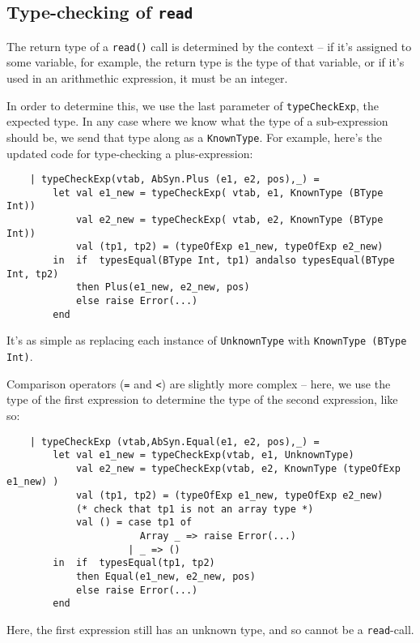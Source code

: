 \documentclass{article}
\begin{document}
\subsection{Type-checking of \texttt{read}}
The return type of a \texttt{read()} call is determined by the context -- if it's assigned to some variable, for example, the return type is the type of that variable, or if it's used in an arithmethic expression, it must be an integer.

In order to determine this, we use the last parameter of \texttt{typeCheckExp}, the expected type. In any case where we know what the type of a sub-expression should be, we send that type along as a \texttt{KnownType}. For example, here's the updated code for type-checking a plus-expression:

\begin{lstlisting}
    | typeCheckExp(vtab, AbSyn.Plus (e1, e2, pos),_) =
        let val e1_new = typeCheckExp( vtab, e1, KnownType (BType Int))
            val e2_new = typeCheckExp( vtab, e2, KnownType (BType Int))
            val (tp1, tp2) = (typeOfExp e1_new, typeOfExp e2_new)
        in  if  typesEqual(BType Int, tp1) andalso typesEqual(BType Int, tp2)
            then Plus(e1_new, e2_new, pos)
            else raise Error(...)
        end
\end{lstlisting}

It's as simple as replacing each instance of \texttt{UnknownType} with \texttt{KnownType (BType Int)}.

Comparison operators (\texttt{=} and \texttt{<}) are slightly more complex -- here, we use the type of the first expression to determine the type of the second expression, like so:

\begin{lstlisting}
    | typeCheckExp (vtab,AbSyn.Equal(e1, e2, pos),_) =
        let val e1_new = typeCheckExp(vtab, e1, UnknownType)
            val e2_new = typeCheckExp(vtab, e2, KnownType (typeOfExp e1_new) )
            val (tp1, tp2) = (typeOfExp e1_new, typeOfExp e2_new)
            (* check that tp1 is not an array type *)
            val () = case tp1 of
                       Array _ => raise Error(...)
                     | _ => ()
        in  if  typesEqual(tp1, tp2)
            then Equal(e1_new, e2_new, pos)
            else raise Error(...)
        end
\end{lstlisting}

Here, the first expression still has an unknown type, and so cannot be a \texttt{read}-call.
\end{document}
